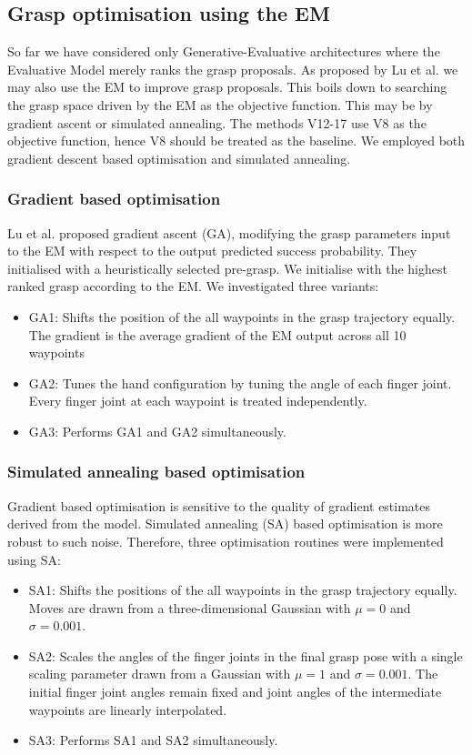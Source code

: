 \subsection{Grasp optimisation using the EM}

So far we have considered only Generative-Evaluative architectures where the Evaluative Model merely ranks the grasp proposals. As proposed by Lu et al. \cite{lu2017planning} we may also use the EM to improve grasp proposals. This boils down to searching the grasp space driven by the EM as the objective function. This may be by gradient ascent or simulated annealing. The methods V12-17 use V8 as the objective function, hence V8 should be treated as the baseline. We employed both gradient descent based optimisation and simulated annealing.

\subsubsection{Gradient based optimisation}
Lu et al. \cite{lu2017planning} proposed gradient ascent (GA), modifying the grasp parameters input to the EM with respect to the output predicted success probability. They initialised with a heuristically selected pre-grasp. We initialise with the highest ranked grasp according to the EM. We investigated three variants:
\begin{itemize}
\item GA1: Shifts the position of the all waypoints in the grasp trajectory equally. The gradient is the average gradient of the EM output across all 10 waypoints
\item GA2: Tunes the hand configuration by tuning the angle of each finger joint. Every finger joint at each waypoint is treated independently.
\item GA3: Performs GA1 and GA2 simultaneously.
\end{itemize}

\subsubsection{Simulated annealing based optimisation}
Gradient based optimisation is sensitive to the quality of gradient estimates derived from the model. Simulated annealing (SA) based optimisation is more robust to such noise. Therefore, three optimisation routines were implemented using SA:
\begin{itemize}
\item SA1: Shifts the positions of the all waypoints in the grasp trajectory equally. Moves are drawn from a three-dimensional Gaussian with $\mu=0$ and $\sigma=0.001$. 
\item SA2: Scales the angles of the finger joints in the final grasp pose with a single scaling parameter drawn from a Gaussian with $\mu=1$ and $\sigma=0.001$. The initial finger joint angles remain fixed and joint angles of the intermediate waypoints are linearly interpolated. 
\item SA3: Performs SA1 and SA2 simultaneously.
\end{itemize}